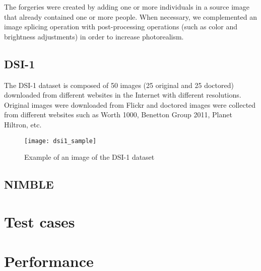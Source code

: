 The forgeries were created by adding one or more individuals in a source image that already contained one or more people. When necessary, we complemented an image splicing operation with post-processing operations (such as color and brightness adjustments) in order to increase photorealism.

\subsection{DSI-1}

The DSI-1 dataset is composed of 50 images (25 original and 25 doctored) downloaded from different websites in the Internet with different resolutions. Original images were downloaded from Flickr and doctored images were collected from different websites such as Worth 1000, Benetton Group 2011, Planet Hiltron, etc.

\begin{figure}[h!]
  \centering
    \texttt{[image: dsi1\_sample]}
    \caption{Example of an image of the DSI-1 dataset}
    \label{fig:dsisample}
\end{figure}

\subsection{NIMBLE}

\section{Test cases}

\section{Performance}
